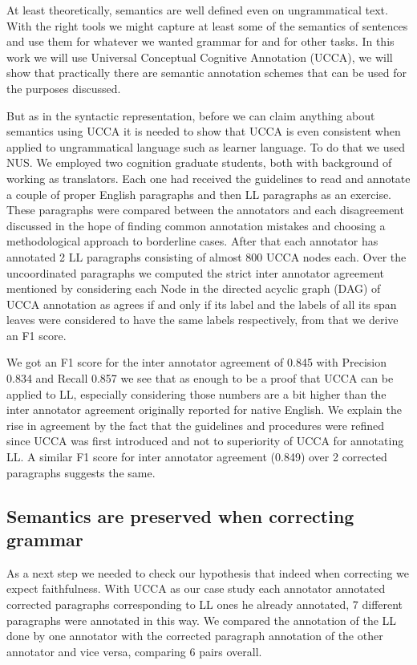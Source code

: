 \documentclass[english]{article}
\begin{document}
At least theoretically, semantics are well defined even on ungrammatical
text. With the right tools we might capture at least some of the semantics
of sentences and use them for whatever we wanted grammar for and for
other tasks. In this work we will use Universal Conceptual Cognitive
Annotation (UCCA)\cite{abend2013universal}, we will show that practically
there are semantic annotation schemes that can be used for the purposes
discussed.

But as in the syntactic representation, before we can claim anything
about semantics using UCCA it is needed to show that UCCA is even
consistent when applied to ungrammatical language such as learner
language. To do that we used NUS\cite{dahlmeier2013building}. We employed two cognition graduate students, both
with background of working as translators. Each
one had received the guidelines to read and annotate a couple of
proper English paragraphs and then LL paragraphs as
an exercise. These paragraphs were compared between the annotators
and each disagreement discussed in the hope of finding common annotation
mistakes and choosing a methodological approach to borderline cases.
After that each annotator has annotated 2 LL paragraphs
consisting of almost 800 UCCA nodes each. Over the uncoordinated paragraphs
we computed the strict inter annotator agreement mentioned by \cite{abend2013universal}
considering each Node in the directed acyclic graph (DAG) of UCCA
annotation as agrees if and only if its label and the labels of all
its span leaves were considered to have the same labels respectively,
from that we derive an F1 score. 

We got an F1 score for the inter annotator agreement of 0.845 with
Precision 0.834 and Recall 0.857 we see that as enough to be a proof
that UCCA can be applied to LL, especially considering those numbers
are a bit higher than the inter annotator agreement originally reported for native English\cite{abend2013universal}.
We explain the rise in agreement by the fact that the guidelines and
procedures were refined since UCCA was first introduced and not to
superiority of UCCA for annotating LL. A similar F1
score for inter annotator agreement (0.849) over 2 corrected paragraphs
suggests the same.

\subsection{Semantics are preserved when correcting grammar}

As a next step we needed to check our hypothesis that indeed when correcting we expect faithfulness. With UCCA as our case study each annotator annotated corrected paragraphs corresponding
to LL ones he already annotated, 7 different paragraphs were annotated
in this way. 
We compared the annotation of the LL done by one annotator
with the corrected
paragraph annotation of the other annotator and vice versa, comparing 6 pairs overall. 
\end{document}
